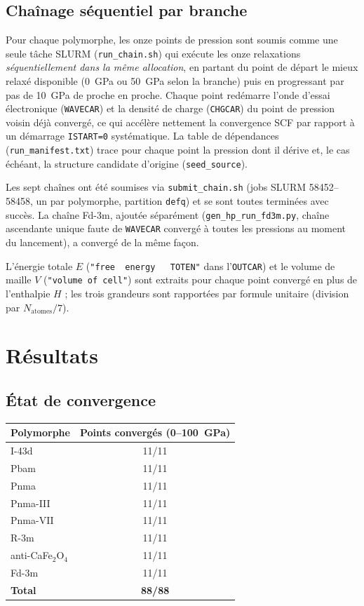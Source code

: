 \documentclass[11pt,a4paper]{article}
\begin{document}
\subsection{Chaînage séquentiel par branche}

Pour chaque polymorphe, les onze points de pression sont soumis comme une seule tâche SLURM
(\texttt{run\_chain.sh}) qui exécute les onze relaxations \emph{séquentiellement dans la même
allocation}, en partant du point de départ le mieux relaxé disponible (0~GPa ou 50~GPa selon
la branche) puis en progressant par pas de 10~GPa de proche en proche. Chaque point redémarre
l'onde d'essai électronique (\texttt{WAVECAR}) et la densité de charge (\texttt{CHGCAR}) du
point de pression voisin déjà convergé, ce qui accélère nettement la convergence SCF par
rapport à un démarrage \texttt{ISTART=0} systématique. La table de dépendances
(\texttt{run\_manifest.txt}) trace pour chaque point la pression dont il dérive et, le cas
échéant, la structure candidate d'origine (\texttt{seed\_source}).

Les sept chaînes ont été soumises via \texttt{submit\_chain.sh} (jobs SLURM
58452--58458, un par polymorphe, partition \texttt{defq}) et se sont toutes terminées avec
succès. La chaîne Fd-3m, ajoutée séparément (\texttt{gen\_hp\_run\_fd3m.py}, chaîne ascendante
unique faute de \texttt{WAVECAR} convergé à toutes les pressions au moment du lancement), a
convergé de la même façon.

L'énergie totale $E$ (\texttt{"free~~energy~~~TOTEN"} dans l'\texttt{OUTCAR}) et le volume de
maille $V$ (\texttt{"volume~of~cell"}) sont extraits pour chaque point convergé en plus de
l'enthalpie $H$ ; les trois grandeurs sont rapportées par formule unitaire (division par
$N_{\text{atomes}}/7$).

\section{Résultats}

\subsection{État de convergence}

\begin{center}
\begin{tabular}{lc}
\toprule
Polymorphe & Points convergés (0--100~GPa) \\
\midrule
I-43d              & 11/11 \\
Pbam               & 11/11 \\
Pnma               & 11/11 \\
Pnma-III           & 11/11 \\
Pnma-VII           & 11/11 \\
R-3m               & 11/11 \\
anti-CaFe$_2$O$_4$ & 11/11 \\
Fd-3m              & 11/11 \\
\midrule
\textbf{Total} & \textbf{88/88} \\
\bottomrule
\end{tabular}
\end{center}
\end{document}
